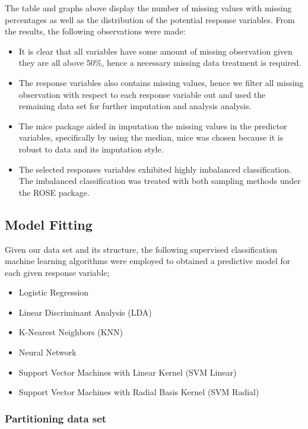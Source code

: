 \documentclass[
  10pt,
]{article}
\begin{document}
The table and graphs above display the number of missing values with missing percentages as well as the distribution of the potential response variables. From the results, the following observations were made:

\begin{itemize}
\item
  It is clear that all variables have some amount of missing observation given they are all above 50\%, hence a necessary missing data treatment is required.
\item
  The response variables also contains missing values, hence we filter all missing observation with respect to each response variable out and used the remaining data set for further imputation and analysis analysis.
\item
  The mice package aided in imputation the missing values in the predictor variables, specifically by using the median, mice was chosen because it is robust to data and its imputation style.
\item
  The selected responses variables exhibited highly imbalanced classification. The imbalanced classification was treated with both sampling methods under the ROSE package.
\end{itemize}

\hypertarget{model-fitting}{%
\subsection{Model Fitting}\label{model-fitting}}

Given our data set and its structure, the following supervised classification machine learning algorithms were employed to obtained a predictive model for each given response variable;

\begin{itemize}
\item
  Logistic Regression
\item
  Linear Discriminant Analysis (LDA)
\item
  K-Nearest Neighbors (KNN)
\item
  Neural Network
\item
  Support Vector Machines with Linear Kernel (SVM Linear)
\item
  Support Vector Machines with Radial Basis Kernel (SVM Radial)
\end{itemize}

\hypertarget{partitioning-data-set}{%
\subsubsection{Partitioning data set}\label{partitioning-data-set}}
\end{document}
